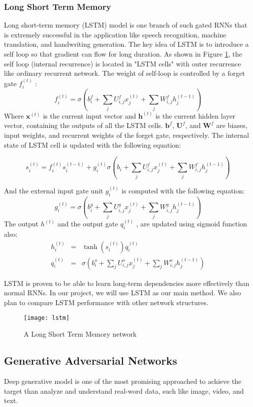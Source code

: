 \subsubsection{Long Short Term Memory}
Long short-term memory (LSTM) model \cite{hochreiter1997lstm} is one branch of such gated RNNs that is extremely successful in the application like speech recognition, machine translation, and handwriting generation.
%
The key idea of LSTM is to introduce a self loop so that gradient can flow for long duration. As shown in Figure \ref{fig:lstm}, the self loop (internal recurrence) is located in "LSTM cells" with outer recurrence like ordinary recurrent network. The weight of self-loop is controlled by a forget gate \(f_i^{(t)}\)
:
\[f_i^{(t)} = \sigma (b_i^f + \sum_{j}U_{i,j}^f x_j^{(t)} +\sum_{j}W_{i,j}^f h_j^{(t-1)} ) \]
Where \(\boldsymbol{x}^{(t)}\) is the current input vector and \(\boldsymbol{h}^{(t)}\) is the current hidden layer vector, containing the outputs of all the LSTM cells. \(\boldsymbol{b}^f\), \(\boldsymbol{U}^f\), and \(\boldsymbol{W}^f\) are biases, input weights, and recurrent weights of the forget gate, respectively. The internal state of LSTM cell is updated with the following equation:
\begin{small}
\[s_i^{(t)} = f_i^{(t)}s_i^{(t-1)}+g_i^{(t)}\sigma(b_i + \sum_{j}U_{i,j}^f x_j^{(t)} +\sum_{j}W_{i,j}^f h_j^{(t-1)} )\]
\end{small}
And the external input gate unit
\(g_i^{(t)} \)
is computed with the following equation:
\[g_i^{(t)} = \sigma (b_i^g + \sum_{j}U_{i,j}^g x_j^{(t)} +\sum_{j}W_{i,j}^g h_j^{(t-1)} ) \]
The output
\(h^{(t)}\)
and the output gate
\(q_i^{(t)}\)
, are updated using sigmoid function also:
\begin{eqnarray*}
h_i^{(t)} &=& \tanh (s_i^{(t)})q_i^{(t)}\\
q_i^{(t)} &=& \sigma (b_i^o + \sum_{j}U_{i,j}^o x_j^{(t)} +\sum_{j}W_{i,j}^o h_j^{(t-1)} )
\end{eqnarray*}

LSTM is proven to be able to learn long-term dependencies more effectively than normal RNNs. In our project, we will use LSTM as our main method. We also plan to compare LSTM performance with other network structures.
\begin{figure}[htb]
	\centering
	\texttt{[image: lstm]}
	\caption{A Long Short Term Memory network}
	\label{fig:lstm}
\end{figure} 

\subsection{Generative Adversarial Networks}
Deep generative model is one of the most promising approached to achieve the target than analyze and understand real-word data, such like image, video, and text. 
